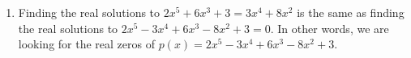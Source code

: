 {
\begin{enumerate}

\item  Finding the real solutions to $2x^5+6x^3+3 = 3x^4+8x^2$ is the same as finding the real solutions to $2x^5-3x^4+6x^3-8x^2+3=0$.  In other words, we are looking for the real zeros of $p(x)=  2x^5-3x^4+6x^3-8x^2+3$. 
\end{enumerate}}

